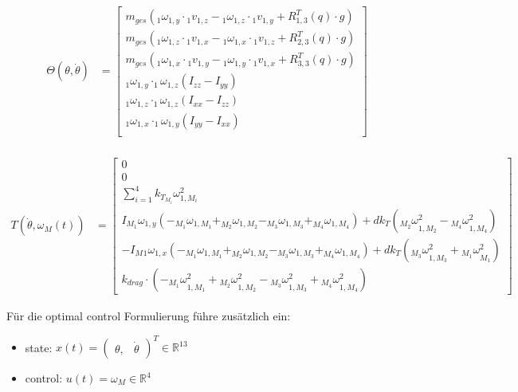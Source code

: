 \documentclass[12pt, a4paper]{scrartcl}
\newcommand{\R}{\mathbb{R}}
\begin{document}
\begin{align*}	
	\Theta(\theta, \dot \theta ) &=
			\left[
				\begin{matrix}
					m_{ges} \left( {_{1}} \omega_{1, y} \cdot {_{1}} v_{1, z} -  {_{1}} \omega_{1, z} \cdot {_{1}} v_{1, y} + R_{1, 3}^T(q) \cdot g \right)\\
					m_{ges} \left( {_{1}} \omega_{1, z} \cdot {_{1}} v_{1, x} -  {_{1}} \omega_{1, x} \cdot {_{1}} v_{1, z} + R_{2, 3}^T(q) \cdot g \right)\\
					m_{ges} \left( {_{1}} \omega_{1, x} \cdot {_{1}} v_{1, y} -  {_{1}} \omega_{1, y} \cdot {_{1}} v_{1, x} + R_{3, 3}^T(q) \cdot g \right)\\
					_{1}\omega_{1,y} \cdot _{1}\omega_{1,z}\left(I_{zz}-I_{yy}\right)  \\
					_{1}\omega_{1,z} \cdot _{1}\omega_{1,z}\left(I_{xx}-I_{zz}\right)  \\
					_{1}\omega_{1,x} \cdot _{1}\omega_{1,y}\left(I_{yy}-I_{xx}\right)  \\
				\end{matrix}
			\right] \\
\end{align*}

\begin{align*}		
	T(\dot\theta, \omega_M(t))  &= 
	\left[
	\begin{matrix}   0 \\ 
	                 0 \\ 
                   \sum_{i = 1}^4 k_{T} _{M_i}\omega^2_{1,M_i} \\
                   I_M _{1}\omega_{1, y} (- _{M_1}\omega_{1,M_1}+ _{M_2}\omega_{1,M_2} - _{M_3}\omega_{1,M_3} + _{M_4}\omega_{1,M_4}) + d k_{T} \left({_{M_2}\omega}^2_{1,M_2} - {_{M_4}\omega}^2_{1,M_4}\right) \\
                   -I_M {_{1}} \omega_{1, x} ( -_{M_1}\omega_{1,M_1} + _{M_2}\omega_{1,M_2} - _{M_3}\omega_{1,M_3} + _{M_4}\omega_{1,M_4}) +d k_{T} \left({_{M_3}\omega}^2_{1,M_3} + {_{M_1}\omega}^2_{M_1}\right) \\
                  k_{drag} \cdot \left(- {_{M_1}\omega}^2_{1,M_1} + {_{M_2}\omega}^2_{1,M_2}  - {_{M_3}\omega}^2_{1,M_3} +  {_{M_4}\omega}^2_{1,M_4}\right)  \end{matrix}
	\right]
\end{align*}



Für die optimal control Formulierung führe zusätzlich ein:
\begin{itemize}
	\item state: $x(t) =\left(\begin{matrix} \theta, &\dot \theta \end{matrix}\right)^T \in \R^{13}$
	\item control: $u(t) = \omega_{M} \in \R^{4}$
\end{itemize}
\end{document}
